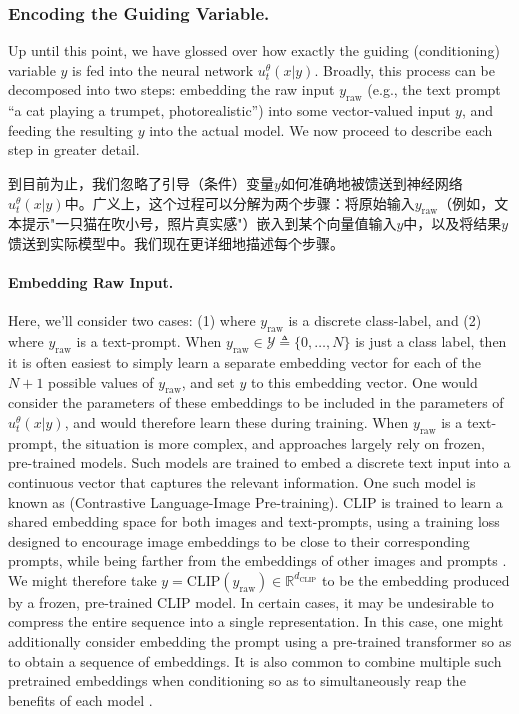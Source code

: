 \subsubsection{Encoding the Guiding Variable.} 
Up until this point, we have glossed over how exactly the guiding (conditioning) variable $y$ is fed into the neural network $u_t^\theta(x|y)$. Broadly, this process can be decomposed into two steps: embedding the raw input $y_{\text{raw}}$ (e.g., the text prompt ``a cat playing a trumpet, photorealistic'') into some vector-valued input $y$, and feeding the resulting $y$ into the actual model. We now proceed to describe each step in greater detail.

到目前为止，我们忽略了引导（条件）变量$y$如何准确地被馈送到神经网络$u_t^\theta(x|y)$中。广义上，这个过程可以分解为两个步骤：将原始输入$y_{\text{raw}}$（例如，文本提示"一只猫在吹小号，照片真实感"）嵌入到某个向量值输入$y$中，以及将结果$y$馈送到实际模型中。我们现在更详细地描述每个步骤。

\paragraph{Embedding Raw Input.} Here, we'll consider two cases: (1) where $y_{\text{raw}}$ is a discrete class-label, and (2) where $y_{\text{raw}}$ is a text-prompt. When $y_{\text{raw}} \in \mathcal{Y} \triangleq \{0,\dots, N\}$ is just a class label, then it is often easiest to simply learn a separate embedding vector for each of the $N+1$ possible values of $y_{\text{raw}}$, and set $y$ to this embedding vector. One would consider the parameters of these embeddings to be included in the parameters of $u_t^\theta(x|y)$, and would therefore learn these during training. When $y_{\text{raw}}$ is a text-prompt, the situation is more complex, and approaches largely rely on frozen, pre-trained models. Such models are trained to embed a discrete text input into a continuous vector that captures the relevant information. One such model is known as  (Contrastive Language-Image Pre-training). CLIP is trained to learn a shared embedding space for both images and text-prompts, using a training loss designed to encourage image embeddings to be close to their corresponding prompts, while being farther from the embeddings of other images and prompts \cite{clip}. We might therefore take $y = \text{CLIP}(y_{\text{raw}}) \in \mathbb{R}^{d_{\text{CLIP}}}$ to be the embedding produced by a frozen, pre-trained CLIP model. In certain cases, it may be undesirable to compress the entire sequence into a single representation. In this case, one might additionally consider embedding the prompt using a pre-trained transformer so as to obtain a sequence of embeddings. It is also common to combine multiple such pretrained embeddings when conditioning so as to simultaneously reap the benefits of each model \cite{sd3, moviegen}.

